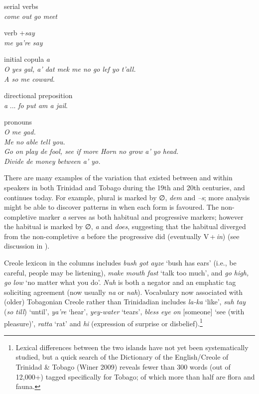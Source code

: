 \documentclass[output=paper,colorlinks,citecolor=brown]{langscibook}
\begin{document}
\ex serial verbs\\
    \textit{come out go meet}

\ex verb +\textit{say}\\
    \textit{me ya’re say}

\ex initial copula \textit{a}\\
    \textit{O yes gal, a’ dat mek me no go lef yo t’all.}\\
    \textit{A so me coward}.

\ex directional preposition\\
    \textit{a} ... \textit{fo put am a jail}.

\ex pronouns\\
    \textit{O me gad.}\\
    \textit{Me no able tell you. }\\
    \textit{Go on play de fool, see if more Horn no grow a’ yo head.}\\
    \textit{Divide de money between a’ yo.}
    \z
\z



There are many examples of the variation that existed between and within speakers in both Trinidad and Tobago during the 19th and 20th centuries, and continues today. For example, plural is marked by ∅, \textit{dem} and \textit{–s}; more analysis might be able to discover patterns in when each form is favoured.  The non-completive marker \textit{a} serves as both habitual and progressive markers; however the habitual is marked by ∅, \textit{a} and \textit{does}, suggesting that the habitual diverged from the non-completive \textit{a} before the progressive did (eventually V\,+\,\textit{in}) (see discussion in \citealt[177--178]{winer_gilbert1987}).

Creole lexicon in the columns includes \textit{bush got ayze} ‘bush has ears’ (i.e., be careful, people may be listening), \textit{make mouth fast} ‘talk too much’, and \textit{go high, go low} ‘no matter what you do’.  \textit{Nuh} is both a negator and an emphatic tag soliciting agreement (now usually \textit{na} or  \textit{nah}).  Vocabulary now associated with (older) Tobagonian Creole rather than Trinidadian includes \textit{la-ka} ‘like’, \textit{suh tay} (\textit{so till}) ‘until’, \textit{ya’re} ‘hear’, \textit{yey-water} ‘tears’, \textit{bless eye on} [someone] ‘see (with pleasure)’, \textit{ratta} ‘rat’ and \textit{hi} (expression of surprise or disbelief).\footnote{ Lexical differences between the two islands have not yet been systematically studied, but a quick search of the Dictionary of the English/Creole of Trinidad \& Tobago (Winer 2009) reveals fewer than 300 words (out of 12,000+) tagged specifically for Tobago; of which more than half are flora and fauna. }
\end{document}
